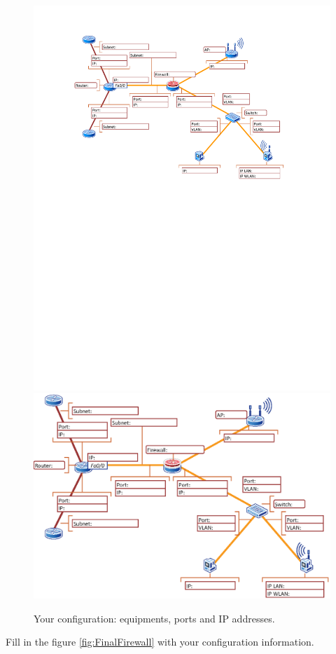 \begin{figure}
\centering
\ifpdf
\includegraphics[width=0.9\linewidth]{Figures/FinalAddresses.pdf}
\else
\includegraphics[width=0.9\linewidth]{Figures/FinalAddresses.eps}
\fi
\caption{Your configuration: equipments, ports and IP addresses.}
\label{fig:FinalAddresses}
\end{figure}

Fill in the figure \ref{fig:FinalFirewall} with your configuration information.

